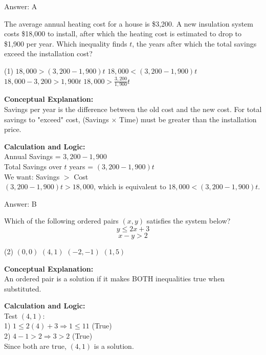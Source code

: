 \documentclass[11pt,paper=a4,answers]{exam}
\begin{document}
\begin{questions}
\begin{solution}
\vspace{15pt}
Answer: \colorbox{yellow!100}{A}
\end{solution}

\question
The average annual heating cost for a house is \$3,200. A new insulation system costs \$18,000 to install, after which the heating cost is estimated to drop to \$1,900 per year. Which inequality finds $t$, the years after which the total savings exceed the installation cost?
\begin{tasks}(1)
    \task $18,000 > (3,200 - 1,900)t$
    \task $18,000 < (3,200 - 1,900)t$
    \task $18,000 - 3,200 > 1,900t$
    \task $18,000 > \frac{3,200}{1,900}t$
\end{tasks}

\begin{solution}
\textbf{Conceptual Explanation:} \\
Savings per year is the difference between the old cost and the new cost. For total savings to "exceed" cost, (Savings $\times$ Time) must be greater than the installation price.

\vspace{10pt}
\textbf{Calculation and Logic:} \\
Annual Savings = $3,200 - 1,900$ \\
Total Savings over $t$ years = $(3,200 - 1,900)t$ \\
We want: Savings $>$ Cost \\
$(3,200 - 1,900)t > 18,000$, which is equivalent to $18,000 < (3,200 - 1,900)t$.

\vspace{15pt}
Answer: \colorbox{yellow!100}{B}
\end{solution}

\question
Which of the following ordered pairs $(x, y)$ satisfies the system below?
\[ y \le 2x + 3 \]
\[ x - y > 2 \]
\begin{tasks}(2)
    \task $(0, 0)$
    \task $(4, 1)$
    \task $(-2, -1)$
    \task $(1, 5)$
\end{tasks}

\begin{solution}
\textbf{Conceptual Explanation:} \\
An ordered pair is a solution if it makes BOTH inequalities true when substituted.

\vspace{10pt}
\textbf{Calculation and Logic:} \\
Test $(4, 1)$: \\
1) $1 \le 2(4) + 3 \Rightarrow 1 \le 11$ (True) \\
2) $4 - 1 > 2 \Rightarrow 3 > 2$ (True) \\
Since both are true, $(4, 1)$ is a solution.


\end{solution}
\end{questions}
\end{document}
